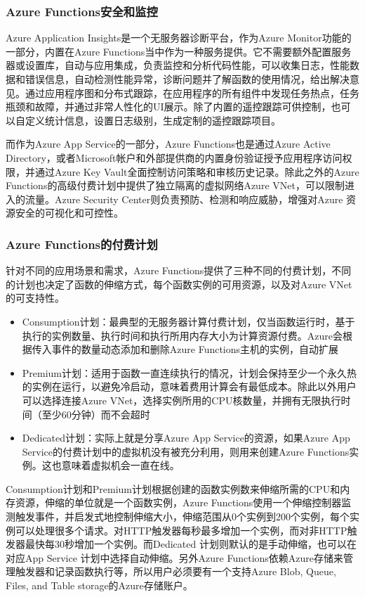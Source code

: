 \subsubsection{Azure Functions安全和监控}
Azure Application Insights是一个无服务器诊断平台，作为Azure Monitor功能的一部分，内置在Azure Functions当中作为一种服务提供。它不需要额外配置服务器或设置库，自动与应用集成，负责监控和分析代码性能，可以收集日志，性能数据和错误信息，自动检测性能异常，诊断问题并了解函数的使用情况，给出解决意见。通过应用程序图和分布式跟踪，在应用程序的所有组件中发现任务热点，任务瓶颈和故障，并通过非常人性化的UI展示。除了内置的遥控跟踪可供控制，也可以自定义统计信息，设置日志级别，生成定制的遥控跟踪项目。

而作为Azure App Service的一部分，Azure Functions也是通过Azure Active Directory，或者Microsoft帐户和外部提供商的内置身份验证授予应用程序访问权限，并通过Azure Key Vault全面控制访问策略和审核历史记录。除此之外的Azure Functions的高级付费计划中提供了独立隔离的虚拟网络Azure VNet，可以限制进入的流量。Azure Security Center则负责预防、检测和响应威胁，增强对Azure 资源安全的可视化和可控性。
\subsubsection{Azure Functions的付费计划}
针对不同的应用场景和需求，Azure Functions提供了三种不同的付费计划，不同的计划也决定了函数的伸缩方式，每个函数实例的可用资源，以及对Azure VNet的可支持性。
\begin{itemize}
	\item Consumption计划：最典型的无服务器计算付费计划，仅当函数运行时，基于执行的实例数量、执行时间和执行所用内存大小为计算资源付费。Azure会根据传入事件的数量动态添加和删除Azure Functions主机的实例，自动扩展
	\item Premium计划：适用于函数一直连续执行的情况，计划会保持至少一个永久热的实例在运行，以避免冷启动，意味着费用计算会有最低成本。除此以外用户可以选择连接Azure VNet，选择实例所用的CPU核数量，并拥有无限执行时间（至少60分钟）而不会超时
	\item Dedicated计划：实际上就是分享Azure App Service的资源，如果Azure App Service的付费计划中的虚拟机没有被充分利用，则用来创建Azure Functions实例。这也意味着虚拟机会一直在线。
\end{itemize}
Consumption计划和Premium计划根据创建的函数实例数来伸缩所需的CPU和内存资源，伸缩的单位就是一个函数实例，Azure Functions使用一个伸缩控制器监测触发事件，并启发式地控制伸缩大小，伸缩范围从0个实例到200个实例，每个实例可以处理很多个请求。对HTTP触发器每秒最多增加一个实例，而对非HTTP触发器最快每30秒增加一个实例。而Dedicated 计划则默认的是手动伸缩，也可以在对应App Service 计划中选择自动伸缩。另外Azure Functions依赖Azure存储来管理触发器和记录函数执行等，所以用户必须要有一个支持Azure Blob, Queue, Files, and Table storage的Azure存储账户。

